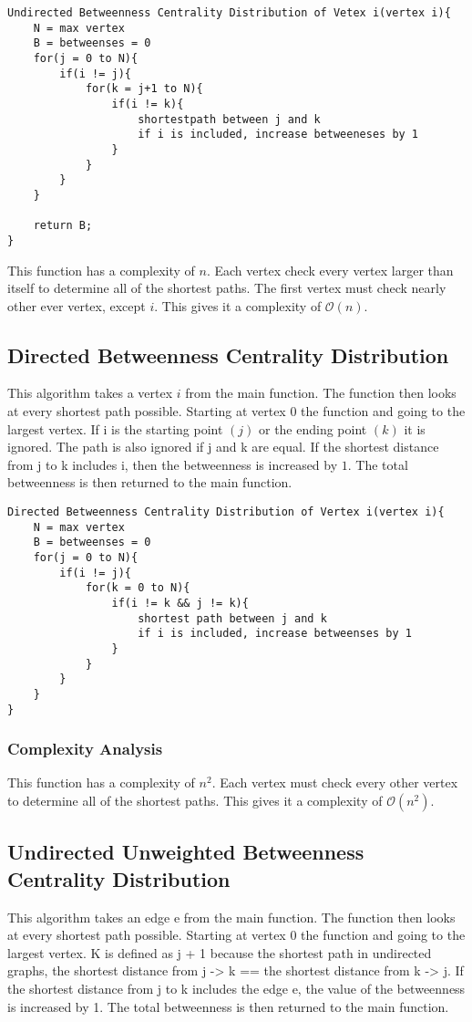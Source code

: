 \documentclass{article}
\begin{document}
\begin{verbatim}
Undirected Betweenness Centrality Distribution of Vetex i(vertex i){
    N = max vertex
    B = betweenses = 0
    for(j = 0 to N){
        if(i != j){
            for(k = j+1 to N){
                if(i != k){
                    shortestpath between j and k
                    if i is included, increase betweeneses by 1
                }
            }
        }
    }

    return B;
}
\end{verbatim}

This function has a complexity of $n$. Each vertex check every vertex larger than itself to determine all of the shortest paths. The first vertex must check nearly other ever vertex, except $i$. This gives it a complexity of $\mathcal{O}(n)$.

\subsection{Directed Betweenness Centrality Distribution}
This algorithm takes a vertex $i$ from the main function. The function then looks at every shortest path possible. Starting at vertex $0$ the function and going to the largest vertex. If i is the starting point $(j)$ or the ending point $(k)$ it is ignored. The path is also ignored if j and k are equal. If the shortest distance from j to k includes i, then the betweenness is increased by $1$. The total betweenness is then returned to the main function.

\begin{verbatim}
Directed Betweenness Centrality Distribution of Vertex i(vertex i){
    N = max vertex
    B = betweenses = 0
    for(j = 0 to N){
        if(i != j){
            for(k = 0 to N){
                if(i != k && j != k){
                    shortest path between j and k
                    if i is included, increase betweenses by 1
                }
            }
        }
    }
}
\end{verbatim}

\subsubsection{Complexity Analysis}
This function has a complexity of $n^2$. Each vertex must check every other vertex to determine
all of the shortest paths. This gives it a complexity of $\mathcal{O}(n^2)$.

\subsection{Undirected Unweighted Betweenness Centrality Distribution}
This algorithm takes an edge e from the main function. The function then looks at every shortest path possible. Starting at vertex 0 the function and going to the largest vertex. K is defined as j + 1 because the shortest path in undirected graphs, the shortest distance from j -> k == the shortest distance from k -> j. If the shortest distance from j to k includes the edge e, the value of the betweenness is increased by 1. The total betweenness is then returned to the main function.
\end{document}
